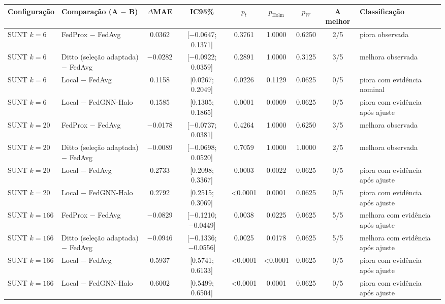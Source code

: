 
\begin{tabular}{>{\raggedright\arraybackslash}l>{\raggedright\arraybackslash}p{3.3cm}cccccc>{\raggedright\arraybackslash}p{3.3cm}}
\toprule
Configuração & Comparação (A $-$ B) & $\Delta$MAE & IC95\% & $p_t$ & $p_{\mathrm{Holm}}$ & $p_W$ & A melhor & Classificação \\
\midrule
SUNT $k=6$ & FedProx − FedAvg & \num{+0.0362} & [\num{-0.0647}; \num{+0.1371}] & \num{0.3761} & \num{1.0000} & \num{0.6250} & 2/5 & piora observada \\
SUNT $k=6$ & Ditto (seleção adaptada) − FedAvg & \num{-0.0282} & [\num{-0.0922}; \num{+0.0359}] & \num{0.2891} & \num{1.0000} & \num{0.3125} & 3/5 & melhora observada \\
SUNT $k=6$ & Local − FedAvg & \num{+0.1158} & [\num{+0.0267}; \num{+0.2049}] & \num{0.0226} & \num{0.1129} & \num{0.0625} & 0/5 & piora com evidência nominal \\
SUNT $k=6$ & Local − FedGNN-Halo & \num{+0.1585} & [\num{+0.1305}; \num{+0.1865}] & \num{0.0001} & \num{0.0009} & \num{0.0625} & 0/5 & piora com evidência após ajuste \\
SUNT $k=20$ & FedProx − FedAvg & \num{-0.0178} & [\num{-0.0737}; \num{+0.0381}] & \num{0.4264} & \num{1.0000} & \num{0.6250} & 3/5 & melhora observada \\
SUNT $k=20$ & Ditto (seleção adaptada) − FedAvg & \num{-0.0089} & [\num{-0.0698}; \num{+0.0520}] & \num{0.7059} & \num{1.0000} & \num{1.0000} & 2/5 & melhora observada \\
SUNT $k=20$ & Local − FedAvg & \num{+0.2733} & [\num{+0.2098}; \num{+0.3367}] & \num{0.0003} & \num{0.0022} & \num{0.0625} & 0/5 & piora com evidência após ajuste \\
SUNT $k=20$ & Local − FedGNN-Halo & \num{+0.2792} & [\num{+0.2515}; \num{+0.3069}] & \num{<0.0001} & \num{0.0001} & \num{0.0625} & 0/5 & piora com evidência após ajuste \\
SUNT $k=166$ & FedProx − FedAvg & \num{-0.0829} & [\num{-0.1210}; \num{-0.0449}] & \num{0.0038} & \num{0.0225} & \num{0.0625} & 5/5 & melhora com evidência após ajuste \\
SUNT $k=166$ & Ditto (seleção adaptada) − FedAvg & \num{-0.0946} & [\num{-0.1336}; \num{-0.0556}] & \num{0.0025} & \num{0.0178} & \num{0.0625} & 5/5 & melhora com evidência após ajuste \\
SUNT $k=166$ & Local − FedAvg & \num{+0.5937} & [\num{+0.5741}; \num{+0.6133}] & \num{<0.0001} & \num{<0.0001} & \num{0.0625} & 0/5 & piora com evidência após ajuste \\
SUNT $k=166$ & Local − FedGNN-Halo & \num{+0.6002} & [\num{+0.5499}; \num{+0.6504}] & \num{<0.0001} & \num{0.0001} & \num{0.0625} & 0/5 & piora com evidência após ajuste \\
\bottomrule
\end{tabular}
